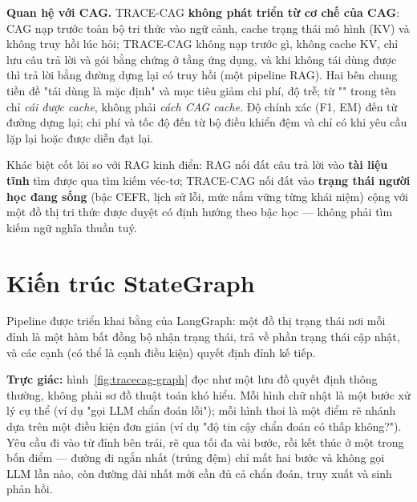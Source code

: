 \textbf{Quan hệ với CAG.} TRACE-CAG \textbf{không phát triển từ cơ chế của CAG}: CAG nạp trước toàn bộ tri thức vào
ngữ cảnh, cache trạng thái mô hình (KV) và không truy hồi lúc hỏi; TRACE-CAG không nạp trước gì, không cache KV, chỉ
lưu câu trả lời và gói bằng chứng ở tầng ứng dụng, và khi không tái dùng được thì trả lời bằng đường dựng lại có
truy hồi (một pipeline RAG). Hai bên chung tiền đề "tái dùng là mặc định" và mục tiêu giảm chi phí, độ trễ; từ
"" trong tên chỉ \emph{cái được cache}, không phải \emph{cách CAG cache}. Độ chính xác (F1, EM) đến
từ đường dựng lại; chi phí và tốc độ đến từ bộ điều khiển đệm và chỉ có khi yêu cầu lặp lại hoặc được diễn đạt lại.

Khác biệt cốt lõi so với RAG kinh điển: RAG nối đất câu trả lời vào \textbf{tài liệu tĩnh}
tìm được qua tìm kiếm véc-tơ; TRACE-CAG nối đất vào \textbf{trạng thái người học đang
sống} (bậc CEFR, lịch sử lỗi, mức nắm vững từng khái niệm) cộng với một đồ thị tri thức
được duyệt có định hướng theo bậc học — không phải tìm kiếm ngữ nghĩa thuần tuý.

\section{Kiến trúc StateGraph}

Pipeline được triển khai bằng  của LangGraph: một đồ thị trạng thái nơi
mỗi đỉnh là một hàm bất đồng bộ nhận trạng thái, trả về phần trạng thái cập nhật, và các
cạnh (có thể là cạnh điều kiện) quyết định đỉnh kế tiếp.

\textbf{Trực giác:} hình~\ref{fig:tracecag-graph} đọc như một lưu đồ quyết định thông
thường, không phải sơ đồ thuật toán khó hiểu. Mỗi hình chữ nhật là một bước xử lý cụ thể
(ví dụ "gọi LLM chẩn đoán lỗi"); mỗi hình thoi là một điểm rẽ nhánh dựa trên một điều kiện
đơn giản (ví dụ "độ tin cậy chẩn đoán có thấp không?"). Yêu cầu đi vào từ đỉnh 
bên trái, rẽ qua tối đa vài bước, rồi kết thúc ở một trong bốn điểm  — đường đi
ngắn nhất (trúng đệm) chỉ mất hai bước và không gọi LLM lần nào, còn đường dài nhất mới cần
đủ cả chẩn đoán, truy xuất và sinh phản hồi.

